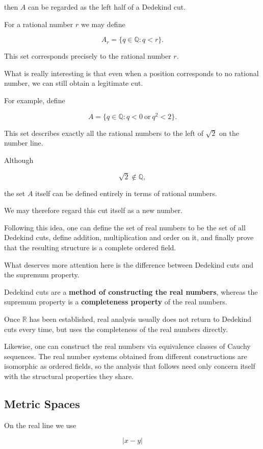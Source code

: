 \documentclass[11pt]{article}
\begin{document}
then $A$ can be regarded as the left half of a Dedekind cut.

For a rational number $r$ we may define

\[
A_{r}=\{q\in\mathbb{Q}:q<r\}.
\]

This set corresponds precisely to the rational number $r$.

What is really interesting is that even when a position corresponds to no rational number, we can still obtain a legitimate cut.

For example, define

\[
A=\{q\in\mathbb{Q}:q<0\ \text{or}\ q^{2}<2\}.
\]

This set describes exactly all the rational numbers to the left of $\sqrt{2}$ on the number line.

Although

\[
\sqrt{2}\notin\mathbb{Q},
\]

the set $A$ itself can be defined entirely in terms of rational numbers.

We may therefore regard this cut itself as a new number.

Following this idea, one can define the set of real numbers to be the set of all Dedekind cuts, define addition, multiplication and order on it, and finally prove that the resulting structure is a complete ordered field.

What deserves more attention here is the difference between Dedekind cuts and the supremum property.

Dedekind cuts are a \textbf{method of constructing the real numbers}, whereas the supremum property is a \textbf{completeness property} of the real numbers.

Once $\mathbb{R}$ has been established, real analysis usually does not return to Dedekind cuts every time, but uses the completeness of the real numbers directly.

Likewise, one can construct the real numbers via equivalence classes of Cauchy sequences. The real number systems obtained from different constructions are isomorphic as ordered fields, so the analysis that follows need only concern itself with the structural properties they share.

\subsection{Metric Spaces}

On the real line we use

\[
|x-y|
\]
\end{document}
